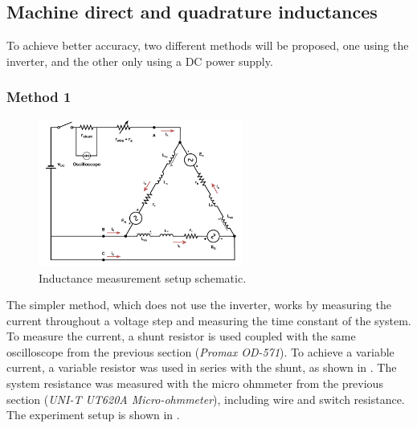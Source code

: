 \subsection{Machine direct and quadrature inductances}
\label{sec:inductance}

To achieve better accuracy, two different methods will be proposed, one using the inverter, and the other only using a DC power supply.
\subsubsection{Method 1}
\label{sec:inductance_method1}

\begin{figure}[!htb]
	\centering
	\includegraphics[width=0.6\textwidth]{Figures/Ld_measure.pdf}
	\caption[Inductance measurement setup schematic.]{Inductance measurement setup schematic.}
	\label{fig:Ld_measure_schematic} %
\end{figure}

The simpler method, which does not use the inverter, works by measuring the current throughout a voltage step and measuring the time constant of the system. To measure the current, a shunt resistor is used coupled with the same oscilloscope from the previous section (\textit{Promax OD-571}). To achieve a variable current, a variable resistor was used in series with the shunt, as shown in . The system resistance was measured with the micro ohmmeter from the previous section (\textit{UNI-T UT620A Micro-ohmmeter}), including wire and switch resistance. The experiment setup is shown in .


